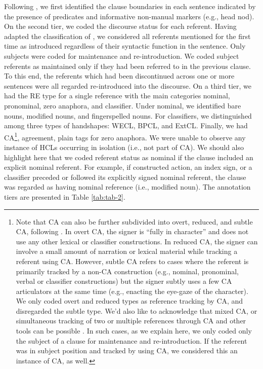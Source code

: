 \documentclass[review]{elsarticle} %
\begin{document}
Following \citet{berman2013relating}, we first identified the clause
boundaries in each sentence indicated by the presence of predicates and
informative non-manual markers (e.g., head nod). On the second tier, we
coded the discourse status for each referent. Having adapted the
classification of \citet{gullberg2006}, we considered all referents
mentioned for the first time as introduced regardless of their syntactic
function in the sentence. Only subjects were coded for maintenance and
re-introduction. We coded subject referents as maintained only if they
had been referred to in the previous clause. To this end, the referents
which had been discontinued across one or more sentences were all
regarded re-introduced into the discourse. On a third tier, we had the
RE type for a single reference with the main categories nominal,
pronominal, zero anaphora, and classifier. Under nominal, we identified
bare nouns, modified nouns, and fingerspelled nouns. For classifiers, we
distinguished among three types of handshapes: WECL, BPCL, and ExtCL.
Finally, we had CA\footnote{Note that CA can also be further subdivided
  into overt, reduced, and subtle CA, following
  \citep{cormier_rethinking_2015}. In overt CA, the signer is ``fully in
  character'' and does not use any other lexical or classifier
  constructions. In reduced CA, the signer can involve a small amount of
  narration or lexical material while tracking a referent using CA.
  However, subtle CA refers to cases where the referent is primarily
  tracked by a non-CA construction (e.g., nominal, pronominal, verbal or
  classifier constructions) but the signer subtly uses a few CA
  articulators at the same time (e.g., enacting the eye-gaze of the
  character). We only coded overt and reduced types as reference
  tracking by CA, and disregarded the subtle type. We'd also like to
  acknowledge that mixed CA, or simultaneous tracking of two or multiple
  references through CA and other tools can be possible
  \citep{dudis2004, liddell2003}. In such cases, as we explain here, we
  only coded only the subject of a clause for maintenance and
  re-introduction. If the referent was in subject position and tracked
  by using CA, we considered this an instance of CA, as well.},
agreement, plain tags for zero anaphora. We were unable to observe any
instance of HCLs occurring in isolation (i.e., not part of CA). We
should also highlight here that we coded referent status as nominal if
the clause included an explicit nominal referent. For example, if
constructed action, an index sign, or a classifier preceded or followed
its explicitly signed nominal referent, the clause was regarded as
having nominal reference (i.e., modified noun). The annotation tiers are
presented in Table \ref{tab:tab-2}.
\end{document}
